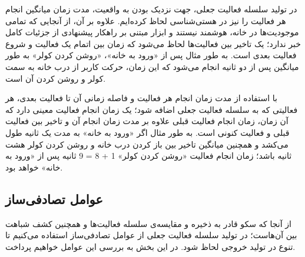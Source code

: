 در تولید سلسله فعالیت جعلی، جهت نزدیک بودن به واقعیت، مدت زمان میانگین انجام هر فعالیت را نیز در هستی‌شناسی لحاظ کرده‌ایم. علاوه بر آن، از آنجایی که تمامی موجودیت‌ها در خانه، هوشمند نیستند و ابزار مبتنی بر راهکار پیشنهادی از جزئیات کامل خبر ندارد؛ یک تاخیر بین فعالیت‌ها لحاظ می‌شود که زمان بین اتمام یک فعالیت و شروع فعالیت بعدی است. به طور مثال پس از «ورود به خانه»، «روشن کردن کولر» به طور میانگین پس از دو ثانیه انجام می‌شود که این زمان، حرکت کاربر از درب خانه به سمت کولر و روشن کردن آن است. 

با استفاده از مدت زمان انجام هر فعالیت و فاصله زمانی آن تا فعالیت بعدی، هر فعالیتی که به سلسله فعالیت جعلی اضافه شود؛ یک زمان انجام فعالیت معینی دارد که آن زمان، زمان انجام فعالیت قبلی علاوه بر مدت زمان انجام آن و تاخیر بین فعالیت قبلی و فعالیت کنونی است. به طور مثال اگر «ورود به خانه» به مدت یک ثانیه طول می‌کشد و همچنین میانگین تاخیر بین باز کردن درب خانه و روشن کردن کولر هشت ثانیه باشد؛ زمان انجام فعالیت «روشن کردن کولر» 1 + 8 = 9 ثانیه پس از «ورود به خانه» خواهد بود.

\subsection{‌عوامل تصادفی‌ساز}

از آنجا که سکو قادر به ذخیره و مقایسه‌ی سلسله فعالیت‌ها و همچنین کشف شباهت بین آن‌هاست؛ در تولید سلسله فعالیت جعلی از عوامل تصادفی‌ساز استفاده می‌کنیم تا تنوع در تولید خروجی لحاظ شود. در این بخش به بررسی این عوامل خواهیم پرداخت.

